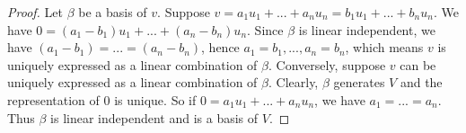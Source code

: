 \begin{proof}
	Let $\beta$ be a basis of $v$. Suppose $v=a_1u_1+...+a_nu_n=b_1u_1+...+b_nu_n$. We have $0=(a_1-b_1)u_1+...+(a_n-b_n)u_n$. Since $\beta$ is linear independent, we have $(a_1-b_1)=...=(a_n-b_n)$, hence $a_1=b_1,...,a_n=b_n$, which means $v$ is uniquely expressed as a linear combination of $\beta$. Conversely, suppose $v$ can be uniquely expressed as a linear combination of $\beta$. Clearly, $\beta$ generates $V$ and the representation of $0$ is unique. So if $0=a_1u_1+...+a_nu_n$, we have $a_1=...=a_n$. Thus $\beta$ is linear independent and is a basis of $V$.
\end{proof}